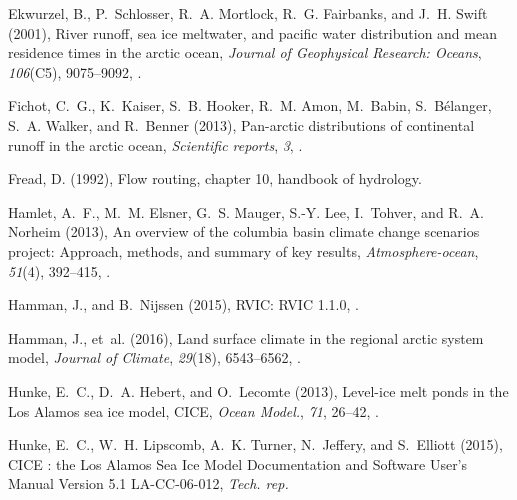 \documentclass[jgrga, draft]{agutex}
\begin{document}
\begin{article}
\begin{thebibliography}{79}
Ekwurzel, B., P.~Schlosser, R.~A. Mortlock, R.~G. Fairbanks, and J.~H. Swift
  (2001), River runoff, sea ice meltwater, and pacific water distribution and
  mean residence times in the arctic ocean, \textit{Journal of Geophysical
  Research: Oceans}, \textit{106}(C5), 9075--9092, .

Fichot, C.~G., K.~Kaiser, S.~B. Hooker, R.~M. Amon, M.~Babin, S.~B{\'e}langer,
  S.~A. Walker, and R.~Benner (2013), Pan-arctic distributions of continental
  runoff in the arctic ocean, \textit{Scientific reports}, \textit{3},
  .

Fread, D. (1992), Flow routing, chapter 10, handbook of hydrology.

Hamlet, A.~F., M.~M. Elsner, G.~S. Mauger, S.-Y. Lee, I.~Tohver, and R.~A.
  Norheim (2013), An overview of the columbia basin climate change scenarios
  project: Approach, methods, and summary of key results,
  \textit{Atmosphere-ocean}, \textit{51}(4), 392--415,
  .

Hamman, J., and B.~Nijssen (2015), {RVIC: RVIC 1.1.0},
  .

Hamman, J., et~al. (2016), Land surface climate in the regional arctic system
  model, \textit{Journal of Climate}, \textit{29}(18), 6543–6562,
  .

Hunke, E.~C., D.~A. Hebert, and O.~Lecomte (2013), {Level-ice melt ponds in the
  Los Alamos sea ice model, CICE}, \textit{Ocean Model.}, \textit{71}, 26--42,
  .

Hunke, E.~C., W.~H. Lipscomb, A.~K. Turner, N.~Jeffery, and S.~Elliott (2015),
  {CICE : the Los Alamos Sea Ice Model Documentation and Software User's Manual
  Version 5.1 LA-CC-06-012}, \textit{Tech. rep.}


\end{thebibliography}
\end{article}
\end{document}
